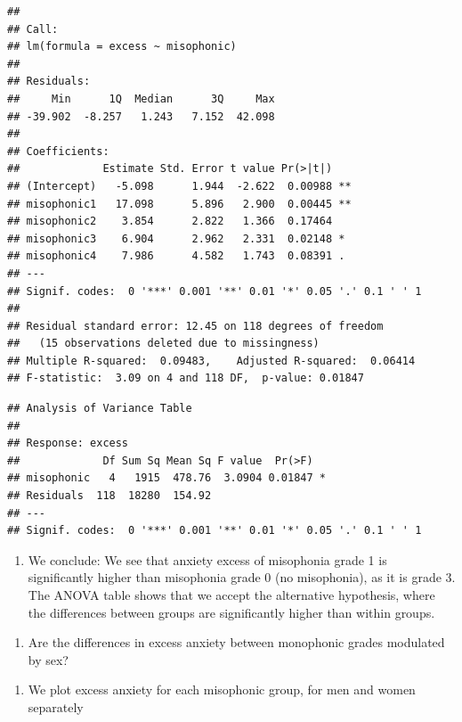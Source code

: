 \documentclass[
]{book}
\providecommand{\tightlist}{%
  \setlength{\itemsep}{0pt}\setlength{\parskip}{0pt}}
\begin{document}
\begin{verbatim}
## 
## Call:
## lm(formula = excess ~ misophonic)
## 
## Residuals:
##     Min      1Q  Median      3Q     Max 
## -39.902  -8.257   1.243   7.152  42.098 
## 
## Coefficients:
##             Estimate Std. Error t value Pr(>|t|)   
## (Intercept)   -5.098      1.944  -2.622  0.00988 **
## misophonic1   17.098      5.896   2.900  0.00445 **
## misophonic2    3.854      2.822   1.366  0.17464   
## misophonic3    6.904      2.962   2.331  0.02148 * 
## misophonic4    7.986      4.582   1.743  0.08391 . 
## ---
## Signif. codes:  0 '***' 0.001 '**' 0.01 '*' 0.05 '.' 0.1 ' ' 1
## 
## Residual standard error: 12.45 on 118 degrees of freedom
##   (15 observations deleted due to missingness)
## Multiple R-squared:  0.09483,    Adjusted R-squared:  0.06414 
## F-statistic:  3.09 on 4 and 118 DF,  p-value: 0.01847
\end{verbatim}

\begin{verbatim}
## Analysis of Variance Table
## 
## Response: excess
##             Df Sum Sq Mean Sq F value  Pr(>F)  
## misophonic   4   1915  478.76  3.0904 0.01847 *
## Residuals  118  18280  154.92                  
## ---
## Signif. codes:  0 '***' 0.001 '**' 0.01 '*' 0.05 '.' 0.1 ' ' 1
\end{verbatim}

\begin{enumerate}
\def\labelenumi{\alph{enumi}.}
\setcounter{enumi}{2}
\tightlist
\item
  We conclude: We see that anxiety excess of misophonia grade 1 is significantly higher than misophonia grade 0 (no misophonia), as it is grade 3. The ANOVA table shows that we accept the alternative hypothesis, where the differences between groups are significantly higher than within groups.
\end{enumerate}

\begin{enumerate}
\def\labelenumi{\arabic{enumi}.}
\setcounter{enumi}{5}
\tightlist
\item
  Are the differences in excess anxiety between monophonic grades modulated by sex?
\end{enumerate}

\begin{enumerate}
\def\labelenumi{\alph{enumi}.}
\tightlist
\item
  We plot excess anxiety for each misophonic group, for men and women separately
\end{enumerate}
\end{document}
